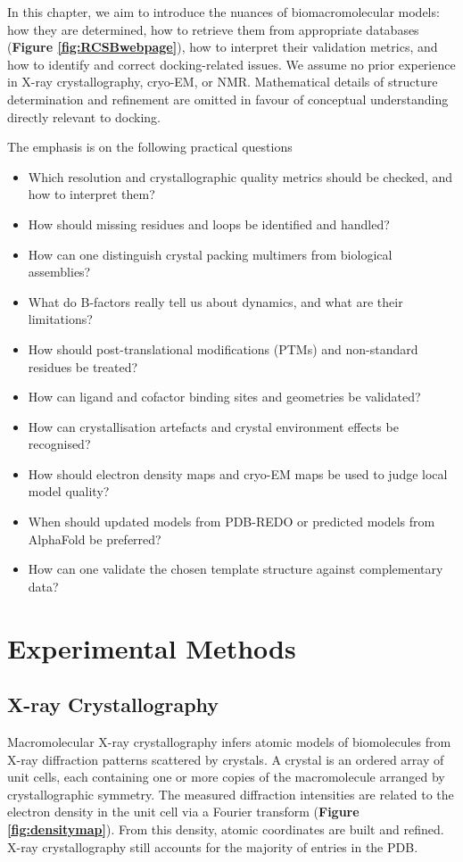 \documentclass[12pt]{article}
\begin{document}
In this chapter, we aim to introduce the nuances of biomacromolecular models: how they are determined, how to retrieve them from appropriate databases (\textbf{Figure \ref{fig:RCSBwebpage}}), how to interpret their validation metrics, and how to identify and correct docking-related issues. We assume no prior experience in X-ray crystallography, cryo-EM, or NMR. Mathematical details of structure determination and refinement are omitted in favour of conceptual understanding directly relevant to docking.

The emphasis is on the following practical questions
\begin{itemize}
  \item Which resolution and crystallographic quality metrics should be checked, and how to interpret them?
  \item How should missing residues and loops be identified and handled?
  \item How can one distinguish crystal packing multimers from biological assemblies?
  \item What do B-factors really tell us about dynamics, and what are their limitations?
  \item How should post-translational modifications (PTMs) and non-standard residues be treated?
  \item How can ligand and cofactor binding sites and geometries be validated?
  \item How can crystallisation artefacts and crystal environment effects be recognised?
  \item How should electron density maps and cryo-EM maps be used to judge local model quality?
  \item When should updated models from PDB-REDO or predicted models from AlphaFold be preferred?
  \item How can one validate the chosen template structure against complementary data?
\end{itemize}

\section{Experimental Methods}



\subsection{X-ray Crystallography}


Macromolecular X-ray crystallography infers atomic models of biomolecules from X-ray diffraction patterns scattered by crystals.\cite{CH4_Evans2013_data_quality,CH4_Wang2015_structure_quality} A crystal is an ordered array of unit cells, each containing one or more copies of the macromolecule arranged by crystallographic symmetry. The measured diffraction intensities are related to the electron density in the unit cell via a Fourier transform (\textbf{Figure \ref{fig:densitymap}}).  From this density, atomic coordinates are built and refined. X-ray crystallography still accounts for the majority of entries in the PDB.\cite{CH4_Berman2000_PDB,CH4_wwpdb2019protein}
\end{document}
